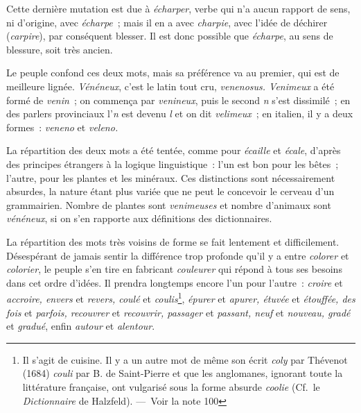 \documentclass[french,twoside]{book} %
\def\mednobreak{\ifdim\lastskip<\medskipamount
  \removelastskip\nopagebreak\medskip\fi}
\newcommand{\labelblock}[1]{\medbreak{\noindent\color{rubric}\bfseries #1}\par\mednobreak}
\begin{document}
\noindent Cette dernière mutation est due à {\itshape écharper}, verbe qui n’a aucun rapport de sens, ni d’origine, avec {\itshape écharpe} ; mais il en a avec {\itshape charpie}, avec l’idée de déchirer ({\itshape carpire}), par conséquent blesser. Il est donc possible que {\itshape écharpe}, au sens de blessure, soit très ancien.\par

\labelblock{{\itshape Venimeux. Vénéneux.}}

\noindent Le peuple confond ces deux mots, mais sa préférence va au premier, qui est de meilleure lignée. {\itshape Vénéneux}, c’est le latin tout cru, {\itshape venenosus. Venimeux} a été formé de {\itshape venin} ; on commença par {\itshape venineux}, puis le second {\itshape n} s’est dissimilé ; en des parlers provinciaux l’{\itshape n} est devenu {\itshape l} et on dit {\itshape velimeux} ; en italien, il y a deux formes : {\itshape veneno} et {\itshape veleno.}\par
La répartition des deux mots a été tentée, comme pour {\itshape écaille} et {\itshape écale}, d’après des principes étrangers à la logique linguistique : l’un est bon pour les bêtes ; l’autre, pour les plantes et les minéraux. Ces distinctions sont nécessairement absurdes, la nature étant plus variée que ne peut le concevoir le cerveau d’un grammairien. Nombre de plantes sont {\itshape venimeuses} et nombre d’animaux sont {\itshape vénéneux}, si on s’en rapporte aux définitions des dictionnaires.\par
La répartition des mots très voisins de forme se fait lentement et difficilement. Désespérant de jamais sentir la différence trop profonde qu’il y a entre {\itshape colorer} et {\itshape colorier}, le peuple s’en tire en fabricant {\itshape couleurer} qui répond à tous ses besoins dans cet ordre d’idées. Il prendra longtemps encore l’un pour l’autre : {\itshape croire} et {\itshape accroire, envers} et {\itshape revers, coulé} et {\itshape coulis}\footnote{ Il s’agit de cuisine. Il y a un autre mot de même son écrit {\itshape coly} par Thévenot (1684) {\itshape couli} par B. de Saint-Pierre et que les anglomanes, ignorant toute la littérature française, ont vulgarisé sous la forme absurde {\itshape coolie} (Cf. le {\itshape Dictionnaire} de Halzfeld). — Voir la note 100}, {\itshape épurer} et {\itshape apurer, étuvée} et {\itshape étouffée, des fois} et {\itshape parfois, recouvrer} et {\itshape recouvrir, passager} et {\itshape passant, neuf} et {\itshape nouveau, gradé} et {\itshape gradué}, enfin {\itshape autour} et {\itshape alentour}.\par
\end{document}
